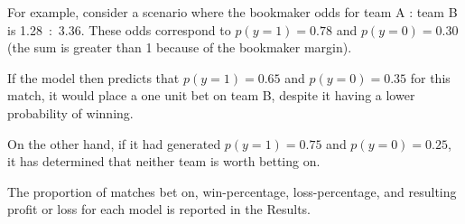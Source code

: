 For example, consider a scenario where the bookmaker odds for team A : team B is 1.28~:~3.36. These odds correspond to $p(y=1)=0.78$ and $p(y=0)=0.30$ (the sum is greater than 1 because of the bookmaker margin).

If the model then predicts that $p(y=1)=0.65$ and $p(y=0)=0.35$ for this match, it would place a one unit bet on team B, despite it having a lower probability of winning. 

On the other hand, if it had generated $p(y=1)=0.75$ and $p(y=0)=0.25$, it has determined that neither team is worth betting on.

The proportion of matches bet on, win-percentage, loss-percentage, and resulting profit or loss for each model is reported in the Results. 